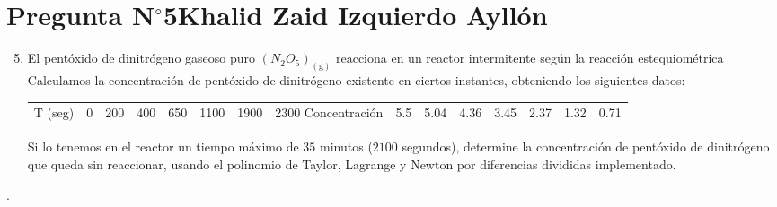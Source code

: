 \section{Pregunta N$^{\circ}$5\qquad Khalid Zaid Izquierdo Ayllón}

\begin{frame}
	\begin{enumerate}\setcounter{enumi}{4}
		\item

		      El pentóxido de dinitrógeno gaseoso puro
		      \begin{math}
			      {\left(
				      N_{2}O_{5}
				      \right)}_{\left(\text{g}\right)}
		      \end{math}
		      reacciona en un reactor
		      intermitente según la reacción estequiométrica
		      Calculamos la concentración de pentóxido de dinitrógeno
		      existente en ciertos instantes, obteniendo los siguientes datos:

		      \begin{tabular}{c|c|c|c|c|c|c|c}
			      T (seg)       & 0   & 200  & 400  & 650  & 1100 & 1900 & 2300
			      Concentración & 5.5 & 5.04 & 4.36 & 3.45 & 2.37 & 1.32 & 0.71
		      \end{tabular}

		      Si lo tenemos en el reactor un tiempo máximo de $35$ minutos
		      ($2100$ segundos), determine la concentración de pentóxido de
		      dinitrógeno que queda sin reaccionar, usando el polinomio de
		      Taylor, Lagrange y Newton por diferencias divididas
		      implementado.
	\end{enumerate}

	\begin{solution}
		.
	\end{solution}
\end{frame}

































